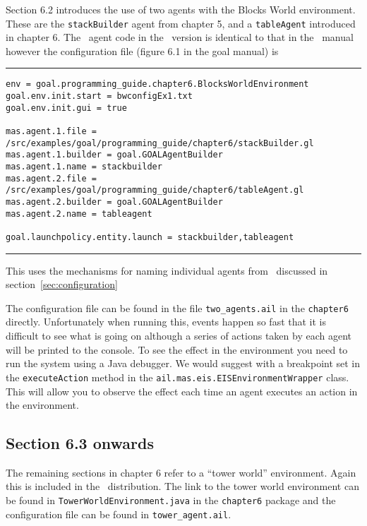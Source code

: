 \documentclass[a4]{article}
\begin{document}
Section 6.2 introduces the use of two agents with the Blocks World environment.  These are the \texttt{stackBuilder} agent from chapter 5, and a \texttt{tableAgent} introduced in chapter 6.  The \goal\ agent code in the \ail\ version is identical to that in the \goal\ manual however the configuration file (figure 6.1 in the goal manual) is

\noindent\rule{\textwidth}{1pt}
\begin{small}
\begin{verbatim}
env = goal.programming_guide.chapter6.BlocksWorldEnvironment
goal.env.init.start = bwconfigEx1.txt
goal.env.init.gui = true

mas.agent.1.file = /src/examples/goal/programming_guide/chapter6/stackBuilder.gl
mas.agent.1.builder = goal.GOALAgentBuilder
mas.agent.1.name = stackbuilder
mas.agent.2.file = /src/examples/goal/programming_guide/chapter6/tableAgent.gl
mas.agent.2.builder = goal.GOALAgentBuilder
mas.agent.2.name = tableagent

goal.launchpolicy.entity.launch = stackbuilder,tableagent
\end{verbatim}
\end{small}
\rule{\textwidth}{1pt}

This uses the mechanisms for naming individual agents from \ail\ discussed in section~\ref{sec:configuration}

\begin{sloppypar}
  The configuration file can be found in the file \texttt{two\_agents.ail} in the \texttt{chapter6} directly.  Unfortunately when running this, events happen so fast that it is difficult to see what is going on although a series of actions taken by each agent will be printed to the console.  To see the effect in the environment you need to run the system using a Java debugger.  We would suggest with a breakpoint set in the \texttt{executeAction} method in the \texttt{ail.mas.eis.EISEnvironmentWrapper} class.  This will allow you to observe the effect each time an agent executes an action in the environment.
  \end{sloppypar}

\subsection{Section 6.3 onwards}

The remaining sections in chapter 6 refer to a ``tower world'' environment.  Again this is included in the \ail\ distribution.  The link to the tower world environment can be found in \texttt{TowerWorldEnvironment.java} in the \texttt{chapter6} package and the configuration file can be found in \texttt{tower\_agent.ail}.
\end{document}
